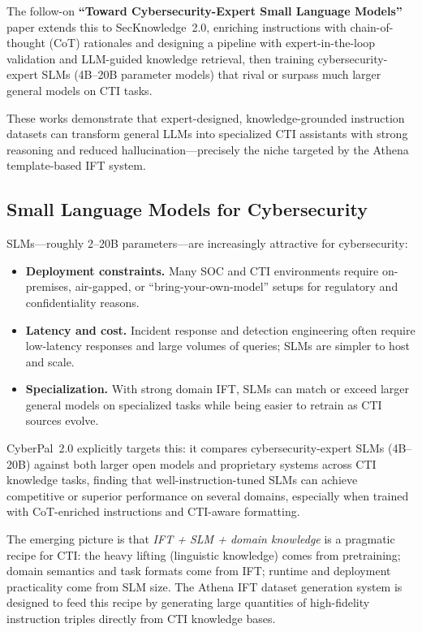 \documentclass[sigconf]{acmart}
\begin{document}
The follow-on \textbf{``Toward Cybersecurity-Expert Small Language Models''} paper extends this to SecKnowledge~2.0, enriching instructions with chain-of-thought (CoT) rationales and designing a pipeline with expert-in-the-loop validation and LLM-guided knowledge retrieval, then training cybersecurity-expert SLMs (4B--20B parameter models) that rival or surpass much larger general models on CTI tasks.\cite{levi2025toward}

These works demonstrate that expert-designed, knowledge-grounded instruction datasets can transform general LLMs into specialized CTI assistants with strong reasoning and reduced hallucination---precisely the niche targeted by the Athena template-based IFT system.

\subsection{Small Language Models for Cybersecurity}

SLMs---roughly 2--20B parameters---are increasingly attractive for cybersecurity:

\begin{itemize}
  \item \textbf{Deployment constraints.} Many SOC and CTI environments require on-premises, air-gapped, or ``bring-your-own-model'' setups for regulatory and confidentiality reasons.
  \item \textbf{Latency and cost.} Incident response and detection engineering often require low-latency responses and large volumes of queries; SLMs are simpler to host and scale.
  \item \textbf{Specialization.} With strong domain IFT, SLMs can match or exceed larger general models on specialized tasks while being easier to retrain as CTI sources evolve.\cite{levi2025toward}
\end{itemize}

CyberPal~2.0 explicitly targets this: it compares cybersecurity-expert SLMs (4B--20B) against both larger open models and proprietary systems across CTI knowledge tasks, finding that well-instruction-tuned SLMs can achieve competitive or superior performance on several domains, especially when trained with CoT-enriched instructions and CTI-aware formatting.\cite{levi2025toward}

The emerging picture is that \emph{IFT + SLM + domain knowledge} is a pragmatic recipe for CTI: the heavy lifting (linguistic knowledge) comes from pretraining; domain semantics and task formats come from IFT; runtime and deployment practicality come from SLM size. The Athena IFT dataset generation system is designed to feed this recipe by generating large quantities of high-fidelity instruction triples directly from CTI knowledge bases.\cite{cardei2025ift}
\end{document}

